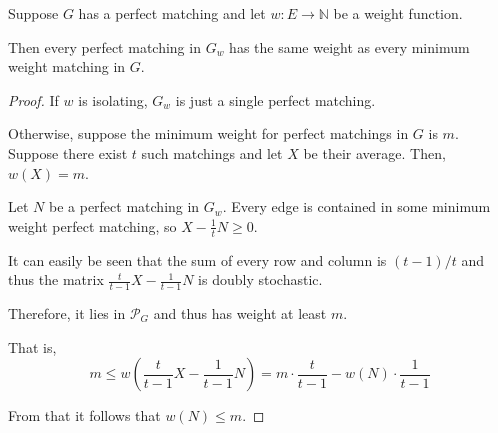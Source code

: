 \documentclass{beamer}
\theoremstyle{remark}
\newcommand{\nn}{\mathbb{N}}
\newcommand{\pmatch}{\mathcal{P}}
\begin{document}
\begin{frame}[allowframebreaks]
  \begin{lemma}
    Suppose $G$ has a perfect matching and let
    $w : E \to \nn$ be a weight function.

    Then every perfect matching in $G_w$ has the same weight
    as every minimum weight matching in $G$.
  \end{lemma}

  \begin{proof}
    If $w$ is isolating, $G_w$ is just a single perfect matching.

    Otherwise, suppose the minimum weight for perfect matchings in $G$
    is $m$. Suppose there exist $t$ such matchings and let
    $X$ be their average. Then, $w(X) = m$.

    Let $N$ be a perfect matching in $G_w$.
    Every edge is contained in some minimum weight perfect matching,
    so $X - \frac{1}{t} N \ge 0$.

    It can easily be seen that the sum of every row and column
    is $(t-1)/t$ and thus the matrix $\frac{t}{t-1} X - \frac{1}{t-1}N$ is
    doubly stochastic.

    Therefore, it lies in $\pmatch_G$ and thus has weight at least $m$.

    That is, \[
      m \le w\left(\frac{t}{t-1} X - \frac{1}{t-1}N\right) =
      m \cdot \frac{t}{t-1} - w(N) \cdot \frac{1}{t-1}
    \]

    From that it follows that $w(N) \le m$.
  \end{proof}
\end{frame}
\end{document}
